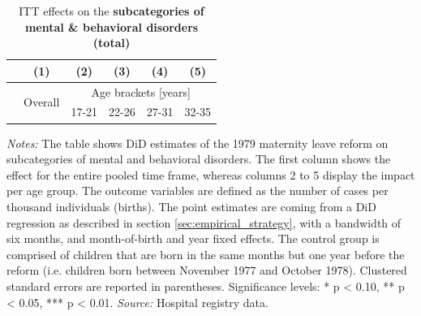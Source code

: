 \documentclass[11pt, a4paper,draft]{article} %
\begin{document}
\newpage
{} 
\vspace*{\fill}
\begin{table}[H] \centering 
	\begin{threeparttable} \centering \caption{ITT effects on the \textbf{subcategories of mental \& behavioral disorders (total)}}\label{tab: ITT_across_d5subcategories_per_age_group_total}
		{\def\sym#1{\ifmmode^{#1}\else\(^{#1}\)\fi} 
			\begin{tabular}{l*{5}{c}}
				\toprule 
				&\multicolumn{1}{c}{(1)}&\multicolumn{1}{c}{(2)}&\multicolumn{1}{c}{(3)}&\multicolumn{1}{c}{(4)}&\multicolumn{1}{c}{(5)}\\
				\midrule
				&\multirow{2}{*}{Overall} & \multicolumn{4}{c}{Age brackets [years]} \\ 
				\cmidrule(lr){3-6}
				&&\multicolumn{1}{c}{17-21}&\multicolumn{1}{c}{22-26}&\multicolumn{1}{c}{27-31}&\multicolumn{1}{c}{32-35}\\
				
				\midrule
				
				
				
				\bottomrule 
		\end{tabular}}
	\end{threeparttable} 
	\begin{minipage}{0.9\linewidth}
		\scriptsize \emph{Notes:} The table shows DiD estimates of the 1979 maternity leave reform on subcategories of mental and behavioral disorders. The first column shows the effect for the entire pooled time frame, whereas columns 2 to 5 display the impact per age group. The outcome variables are defined as the number of cases per thousand individuals (births). The point estimates are coming from a DiD regression as described in section \ref{sec:empirical_strategy}, with a bandwidth of six months, and month-of-birth and year fixed effects. The control group is comprised of children that are born in the same months but one year before the reform (i.e. children born between November 1977 and October 1978). Clustered standard errors are reported in parentheses. \newline Significance levels: * p < 0.10, ** p < 0.05, *** p < 0.01. \newline 	\emph{Source:} Hospital registry data.
	\end{minipage}
\end{table} 
\vspace*{\fill}\clearpage 
\restoregeometry
\newpage
{} 

\restoregeometry
\end{document}
